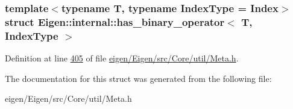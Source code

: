 \subsubsection*{template$<$typename T, typename Index\+Type = Index$>$\newline
struct Eigen\+::internal\+::has\+\_\+binary\+\_\+operator$<$ T, Index\+Type $>$}



Definition at line \hyperlink{eigen_2_eigen_2src_2_core_2util_2_meta_8h_source_l00405}{405} of file \hyperlink{eigen_2_eigen_2src_2_core_2util_2_meta_8h_source}{eigen/\+Eigen/src/\+Core/util/\+Meta.\+h}.



The documentation for this struct was generated from the following file\+:\begin{DoxyCompactItemize}
\item 
eigen/\+Eigen/src/\+Core/util/\+Meta.\+h\end{DoxyCompactItemize}
